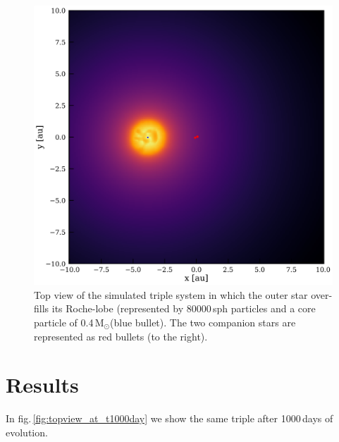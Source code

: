 \documentclass{aastex62}
\newcommand{\MSun}{\mbox{M$_\odot$}}
\begin{document}
\begin{figure}[ht!]
  \includegraphics[width=\columnwidth]{fig_t0_N80000_M012MSun1109MSun_a02au_e00_inc9deg.pdf}
\caption{Top view of the simulated triple system in which the outer star over-fills its Roche-lobe
  (represented by 80000\,sph particles and a core particle of
  0.4\,\MSun (blue bullet). The two companion stars are represented as
  red bullets (to the right).
\label{fig:topview_at_t0}}
\end{figure}

\section{Results} \label{results}

In fig.\,\ref{fig:topview_at_t1000day} we show the same triple 
after 1000\,days of evolution.
\end{document}
